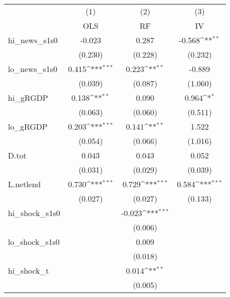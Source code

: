 {
\def\sym#1{\ifmmode^{#1}\else\(^{#1}\)\fi}
\begin{tabular}{l*{3}{c}}
\toprule
            &\multicolumn{1}{c}{(1)}&\multicolumn{1}{c}{(2)}&\multicolumn{1}{c}{(3)}\\
            &\multicolumn{1}{c}{OLS}&\multicolumn{1}{c}{RF}&\multicolumn{1}{c}{IV}\\
\midrule
hi\_news\_s1s0&      -0.023         &       0.287         &      -0.568\sym{**} \\
            &     (0.230)         &     (0.228)         &     (0.232)         \\
\addlinespace
lo\_news\_s1s0&       0.415\sym{***}&       0.223\sym{**} &      -0.889         \\
            &     (0.039)         &     (0.087)         &     (1.060)         \\
\addlinespace
hi\_gRGDP    &       0.138\sym{**} &       0.090         &       0.964\sym{*}  \\
            &     (0.063)         &     (0.060)         &     (0.511)         \\
\addlinespace
lo\_gRGDP    &       0.203\sym{***}&       0.141\sym{**} &       1.522         \\
            &     (0.054)         &     (0.066)         &     (1.016)         \\
\addlinespace
D.tot       &       0.043         &       0.043         &       0.052         \\
            &     (0.031)         &     (0.029)         &     (0.039)         \\
\addlinespace
L.netlend   &       0.730\sym{***}&       0.729\sym{***}&       0.584\sym{***}\\
            &     (0.027)         &     (0.027)         &     (0.133)         \\
\addlinespace
hi\_shock\_s1s0&                     &      -0.023\sym{***}&                     \\
            &                     &     (0.006)         &                     \\
\addlinespace
lo\_shock\_s1s0&                     &       0.009         &                     \\
            &                     &     (0.018)         &                     \\
\addlinespace
hi\_shock\_t  &                     &       0.014\sym{**} &                     \\
            &                     &     (0.005)         &                     \\

\end{tabular}}

